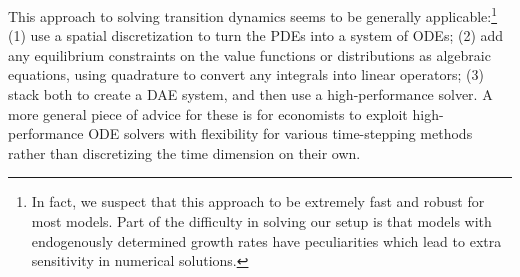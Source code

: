 \documentclass[11pt]{article}
\begin{document}


This approach to solving transition dynamics seems to be generally applicable:\footnote{In fact, we suspect that this approach to be extremely fast and robust for most models.  Part of the difficulty in solving our setup is that models with endogenously determined growth rates have peculiarities which lead to extra sensitivity in numerical solutions.} (1) use a spatial discretization to turn the PDEs into a system of ODEs; (2) add any equilibrium constraints on the value functions or distributions as algebraic equations, using quadrature to convert any integrals into linear operators; (3) stack both to create a DAE system, and then use a high-performance solver.  A more general piece of advice for these is for economists to exploit high-performance ODE solvers with flexibility for various time-stepping methods rather than discretizing the time dimension on their own.
\end{document}
